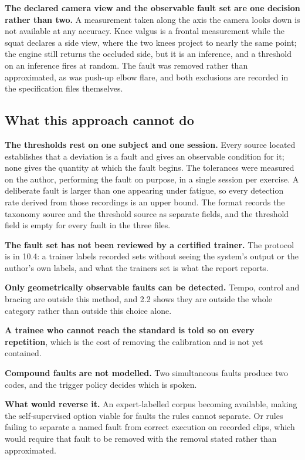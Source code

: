 \textbf{The declared camera view and the observable fault set are one decision rather than two.} A measurement taken along the axis the camera looks down is not available at any accuracy. Knee valgus is a frontal measurement while the squat declares a side view, where the two knees project to nearly the same point; the engine still returns the occluded side, but it is an inference, and a threshold on an inference fires at random. The fault was removed rather than approximated, as was push-up elbow flare, and both exclusions are recorded in the specification files themselves.

\subsection{What this approach cannot do}
\label{sec:4.5.4}

\textbf{The thresholds rest on one subject and one session.} Every source located establishes that a deviation is a fault and gives an observable condition for it; none gives the quantity at which the fault begins. The tolerances were measured on the author, performing the fault on purpose, in a single session per exercise. A deliberate fault is larger than one appearing under fatigue, so every detection rate derived from those recordings is an upper bound. The format records the taxonomy source and the threshold source as separate fields, and the threshold field is empty for every fault in the three files.

\textbf{The fault set has not been reviewed by a certified trainer.} The protocol is in 10.4: a trainer labels recorded sets without seeing the system's output or the author's own labels, and what the trainers set is what the report reports.

\textbf{Only geometrically observable faults can be detected.} Tempo, control and bracing are outside this method, and 2.2 shows they are outside the whole category rather than outside this choice alone.

\textbf{A trainee who cannot reach the standard is told so on every repetition}, which is the cost of removing the calibration and is not yet contained.

\textbf{Compound faults are not modelled.} Two simultaneous faults produce two codes, and the trigger policy decides which is spoken.

\textbf{What would reverse it.} An expert-labelled corpus becoming available, making the self-supervised option viable for faults the rules cannot separate. Or rules failing to separate a named fault from correct execution on recorded clips, which would require that fault to be removed with the removal stated rather than approximated.

